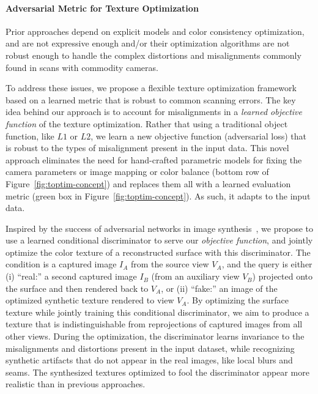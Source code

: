 \paragraph*{Adversarial Metric for Texture Optimization}
Prior approaches depend on explicit models and color consistency optimization, and are not expressive enough and/or their optimization algorithms are not robust enough to handle the complex distortions and misalignments commonly found in scans with commodity cameras.

To address these issues, we propose a flexible texture optimization framework based on a learned metric that is robust to common scanning errors.
 The key idea behind our approach is to account for misalignments in a {\em learned objective function} of the texture optimization.   
 Rather that using a traditional object function, like $L1$ or $L2$, we learn a new objective function (adversarial loss) that is robust to the types of misalignment present in the input data.  This novel approach eliminates the need for hand-crafted parametric models for fixing the camera parameters \cite{zhou2014color,huang20173dlite} or image mapping \cite{bi2017patch,zhou2014color} or color balance \cite{huang20173dlite} (bottom row of Figure~\ref{fig:toptim-concept}) and replaces them all with a learned evaluation metric (green box in Figure~\ref{fig:toptim-concept}).   As such, it adapts to the input data.
 
Inspired by the success of adversarial networks in image synthesis~\cite{goodfellow2014generative}, we propose to use a learned conditional discriminator to serve our {\em objective function}, and jointly optimize the color texture of a reconstructed surface with this discriminator.
The condition is a captured image $I_A$ from the source view $V_A$, and the query is either (i) ``real:'' a second captured image $I_B$ (from an auxiliary view $V_B$) projected onto the surface and then rendered back to $V_A$, or (ii) ``fake:'' an image of the optimized synthetic texture rendered to view $V_A$. By optimizing the surface texture while jointly training this conditional discriminator, we aim to produce a texture that is indistinguishable from reprojections of captured images from all other views.  
%
During the optimization, the discriminator learns invariance to the misalignments and distortions present in the input dataset, while recognizing synthetic artifacts that do not appear in the real images, like local blurs and seams.  The synthesized textures optimized to fool the discriminator appear more realistic than in previous approaches.

